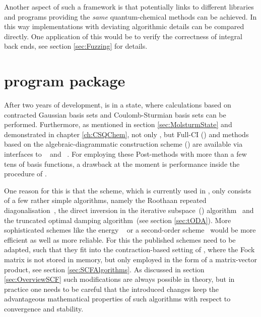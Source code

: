 Another aspect of such a framework is
that potentially links to different libraries and programs
providing the \emph{same} quantum-chemical methods can be achieved.
In this way implementations with deviating algorithmic details
can be compared directly.
One application of this would be to verify the correctness
of integral back ends, see section \ref{sec:Fuzzing} for details.

%
%
\section{\molsturm program package}
\label{sec:newMolsturm}
After two years of development,
\molsturm is in a state,
where calculations based on contracted Gaussian basis sets
and Coulomb-Sturmian basis sets can be performed.
Furthermore, as mentioned in section \vref{sec:MolsturmState}
and demonstrated in chapter \vref{ch:CSQChem},
not only \HF, but Full-CI (\FCI) and
methods based on the algebraic-diagrammatic construction scheme (\ADC)
are available via interfaces to \pyscf~\cite{Sun2017} and \adcman~\cite{Wormit2014}.
For employing these Post-\HF methods
with more than a few tens of basis functions,
a drawback at the moment is performance
inside the \SCF procedure of \molsturm.

One reason for this is that the \SCF scheme,
which is currently used in \molsturm,
only consists of a few rather simple algorithms,
namely the Roothaan repeated diagonalisation~\cite{Roothaan1951},
the direct inversion in the iterative subspace~(\DIIS) algorithm~\cite{Pulay1982}
and the truncated optimal damping algorithm~(see section \ref{sec:tODA}).
More sophisticated schemes
like the energy \DIIS~\cite{Kudin2002}
or a second-order \SCF scheme~\cite{Salek2007,Hoest2008}
would be more efficient as well as more reliable.
For this the published schemes need to be adapted,
such that they fit into the contraction-based setting of \molsturm,
where the Fock matrix is not stored in memory,
but only employed in the form of a matrix-vector product,
see section \vref{sec:SCFAlgorithms}.
As discussed in section \vref{sec:OverviewSCF}
such modifications are always possible in theory,
but in practice one needs to be careful
that the introduced changes
keep the advantageous mathematical properties of such algorithms
with respect to convergence and stability.

